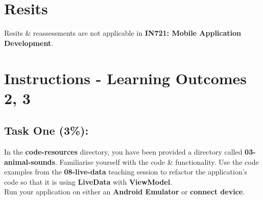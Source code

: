 \documentclass{article}
\begin{document}
\section*{Resits}
Resits \& reassessments are not applicable in \textbf{IN721: Mobile Application Development}.

\newpage

\section*{Instructions - Learning Outcomes 2, 3}
\subsection*{Task One (3\%):}
In the \textbf{code-resources} directory, you have been provided a directory called \textbf{03-animal-sounds}. Familiarise yourself with the code \& functionality. Use the code examples from the \textbf{08-live-data} teaching session to refactor the application's code so that it is using \textbf{LiveData} with \textbf{ViewModel}. \\

Run your application on either an \textbf{Android Emulator} or \textbf{connect device}. \\ 
\end{document}
